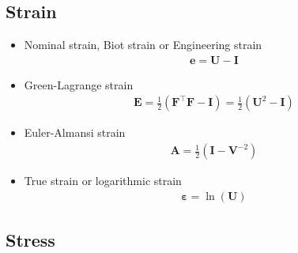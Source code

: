 \documentclass[../main.tex]{subfiles}
\begin{document}
\subsection{Strain}

\begin{itemize}
    \item Nominal strain, Biot strain or Engineering strain
    \begin{align}
        \textbf{e} = \textbf{U} - \textbf{I}
    \end{align}
    \item Green-Lagrange strain
    \begin{align}
        \textbf{E} = \frac{1}{2}(\textbf{F}^{\top}\textbf{F} - \textbf{I}) = \frac{1}{2}(\textbf{U}^2 - \textbf{I})
    \end{align}
    \item Euler-Almansi strain
    \begin{align}
        \textbf{A} = \frac{1}{2}(\textbf{I}-\textbf{V}^{-2})
    \end{align}
    \item True strain or logarithmic strain
    \begin{align}
        \bm{\varepsilon} = \ln(\textbf{U})
    \end{align}
\end{itemize}

\subsection{Stress}
\end{document}
